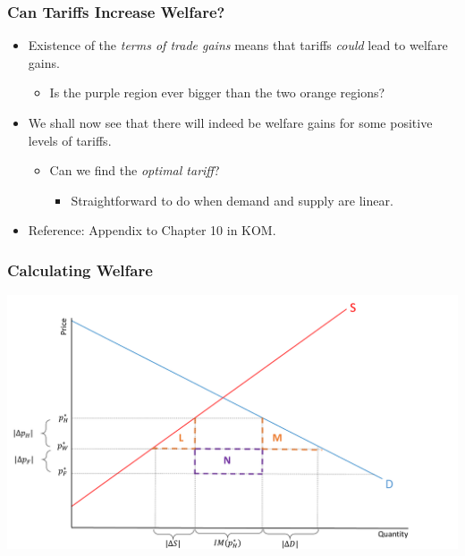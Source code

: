 \documentclass{beamer}
\begin{document}
\begin{frame}
	\frametitle{Can Tariffs Increase Welfare?}
	\begin{itemize}
		\item Existence of the \emph{terms of trade gains} means that tariffs \emph{could} lead to welfare gains.
			\begin{itemize}
				\item Is the purple region ever bigger than the two orange regions?
			\end{itemize}
		\item We shall now see that there will indeed be welfare gains for some positive levels of tariffs.
				\begin{itemize}
					\item Can we find the \emph{optimal tariff}?
						\begin{itemize}
							\item Straightforward to do when demand and supply are linear.
						\end{itemize}
				\end{itemize}
		\item Reference: Appendix to Chapter 10 in KOM.
	\end{itemize}
\end{frame}

\begin{frame}
	\frametitle{Calculating Welfare}
	
	\includegraphics[scale=0.3]{SL_15.pdf}
	
\end{frame}
\end{document}
